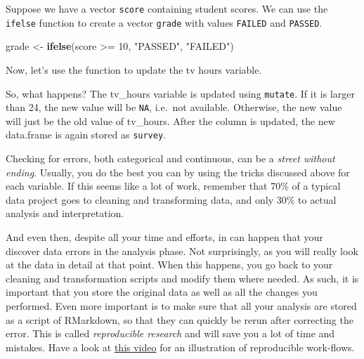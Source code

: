 \documentclass[]{tufte-book}
\newenvironment{Shaded}{}{}
\newcommand{\KeywordTok}[1]{\textcolor[rgb]{0.00,0.44,0.13}{\textbf{#1}}}
\newcommand{\DataTypeTok}[1]{\textcolor[rgb]{0.56,0.13,0.00}{#1}}
\newcommand{\DecValTok}[1]{\textcolor[rgb]{0.25,0.63,0.44}{#1}}
\newcommand{\StringTok}[1]{\textcolor[rgb]{0.25,0.44,0.63}{#1}}
\newcommand{\OtherTok}[1]{\textcolor[rgb]{0.00,0.44,0.13}{#1}}
\newcommand{\OperatorTok}[1]{\textcolor[rgb]{0.40,0.40,0.40}{#1}}
\newcommand{\NormalTok}[1]{#1}
\begin{document}
Suppose we have a vector \texttt{score} containing student scores. We
can use the \texttt{ifelse} function to create a vector \texttt{grade}
with values \texttt{FAILED} and \texttt{PASSED}.

\begin{Shaded}
\begin{Highlighting}[]
\NormalTok{grade <-}\StringTok{ }\KeywordTok{ifelse}\NormalTok{(score }\OperatorTok{>=}\StringTok{ }\DecValTok{10}\NormalTok{, }\StringTok{"PASSED"}\NormalTok{, }\StringTok{"FAILED"}\NormalTok{)}
\end{Highlighting}
\end{Shaded}

Now, let's use the function to update the tv hours variable.

\begin{Shaded}
\end{Shaded}

So, what happens? The tv\_hours variable is updated using
\texttt{mutate}. If it is larger than 24, the new value will be
\texttt{NA}, i.e.~not available. Otherwise, the new value will just be
the old value of tv\_hours. After the column is updated, the new
data.frame is again stored as \texttt{survey}.

Checking for errors, both categorical and continuous, can be a
\emph{street without ending}. Usually, you do the best you can by using
the tricks discussed above for each variable. If this seems like a lot
of work, remember that 70\% of a typical data project goes to cleaning
and transforming data, and only 30\% to actual analysis and
interpretation.

And even then, despite all your time and efforts, in can happen that
your discover data errors in the analysis phase. Not surprisingly, as
you will really look at the data in detail at that point. When this
happens, you go back to your cleaning and transformation scripts and
modify them where needed. As such, it is important that you store the
original data as well as all the changes you performed. Even more
important is to make sure that all your analysis are stored as a script
of RMarkdown, so that they can quickly be rerun after correcting the
error. This is called \emph{reproducible research} and will save you a
lot of time and mistakes. Have a look at
\href{https://www.youtube.com/watch?v=s3JldKoA0zw}{this video} for an
illustration of reproducible work-flows.
\end{document}
